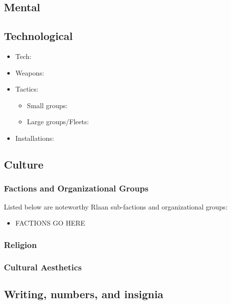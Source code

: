 
\subsection{Mental}


\subsection{Technological}
\begin{itemize}
\item Tech: 
\item Weapons:
\item Tactics:
\begin{itemize}
\item    Small groups: 
\item    Large groups/Fleets: 
\end{itemize}

\item Installations:

\end{itemize}

\subsection{Culture}

\subsubsection{Factions and Organizational Groups}
Listed below are noteworthy Rlaan sub-factions and organizational groups: 
\begin{itemize}
\item FACTIONS GO HERE
\end{itemize}

\subsubsection{Religion}

\subsubsection{Cultural Aesthetics}

\subsection{Writing, numbers, and insignia}

